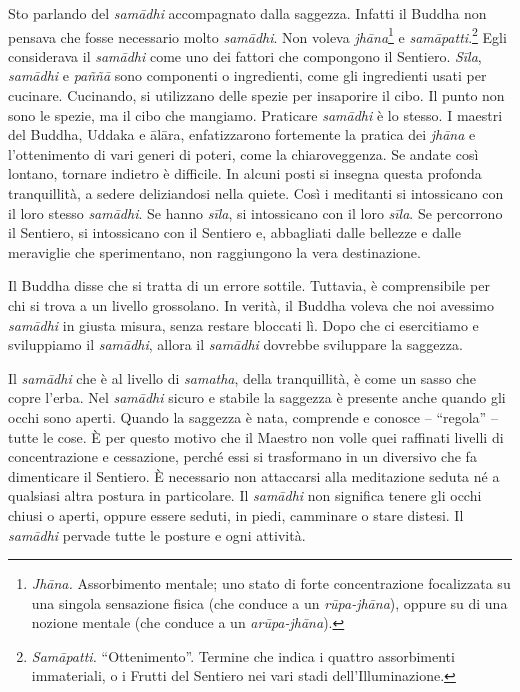 Sto parlando del \emph{samādhi} accompagnato dalla saggezza. Infatti il
Buddha non pensava che fosse necessario molto \emph{samādhi}. Non voleva
\emph{jhāna}\footnote{%
  \emph{Jhāna.} Assorbimento mentale; uno stato di
  forte concentrazione focalizzata su una singola sensazione fisica (che
  conduce a un \emph{rūpa-jhāna}), oppure su di una nozione mentale (che
  conduce a un \emph{arūpa-jhāna}).}
e \emph{samāpatti}.\footnote{%
  \emph{Samāpatti.} ``Ottenimento''. Termine che indica i quattro assorbimenti
  immateriali, o i Frutti del Sentiero nei vari stadi
  dell'Illuminazione.}
Egli considerava il \emph{samādhi} come uno dei
fattori che compongono il Sentiero. \emph{Sīla}, \emph{samādhi} e
\emph{paññā} sono componenti o ingredienti, come gli ingredienti usati
per cucinare. Cucinando, si utilizzano delle spezie per insaporire il
cibo. Il punto non sono le spezie, ma il cibo che mangiamo. Praticare
\emph{samādhi} è lo stesso. I maestri del Buddha, Uddaka e ālāra,
enfatizzarono fortemente la pratica dei \emph{jhāna} e l'ottenimento di
vari generi di poteri, come la chiaroveggenza. Se andate così lontano,
tornare indietro è difficile. In alcuni posti si insegna questa profonda
tranquillità, a sedere deliziandosi nella quiete. Così i meditanti si
intossicano con il loro stesso \emph{samādhi}. Se hanno \emph{sīla}, si
intossicano con il loro \emph{sīla}. Se percorrono il Sentiero, si
intossicano con il Sentiero e, abbagliati dalle bellezze e dalle
meraviglie che sperimentano, non raggiungono la vera destinazione.

Il Buddha disse che si tratta di un errore sottile. Tuttavia, è
comprensibile per chi si trova a un livello grossolano. In verità, il
Buddha voleva che noi avessimo \emph{samādhi} in giusta misura, senza
restare bloccati lì. Dopo che ci esercitiamo e sviluppiamo il
\emph{samādhi}, allora il \emph{samādhi} dovrebbe sviluppare la
saggezza.

Il \emph{samādhi} che è al livello di \emph{samatha}, della
tranquillità, è come un sasso che copre l'erba. Nel \emph{samādhi}
sicuro e stabile la saggezza è presente anche quando gli occhi sono
aperti. Quando la saggezza è nata, comprende e conosce -- ``regola'' --
tutte le cose. È per questo motivo che il Maestro non volle quei
raffinati livelli di concentrazione e cessazione, perché essi si
trasformano in un diversivo che fa dimenticare il Sentiero. È necessario
non attaccarsi alla meditazione seduta né a qualsiasi altra postura in
particolare. Il \emph{samādhi} non significa tenere gli occhi chiusi o
aperti, oppure essere seduti, in piedi, camminare o stare distesi. Il
\emph{samādhi} pervade tutte le posture e ogni attività.

